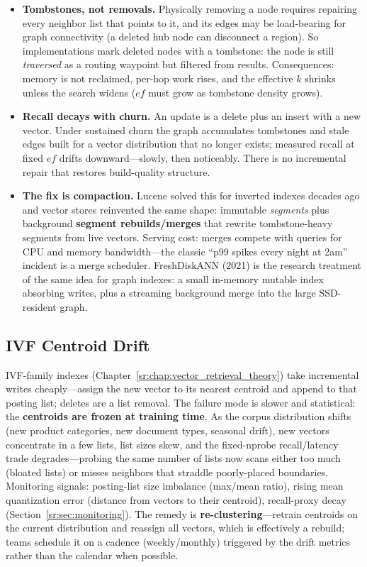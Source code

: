 \begin{itemize}
    \item \textbf{Tombstones, not removals.} Physically removing a node requires repairing every neighbor list that points to it, and its edges may be load-bearing for graph connectivity (a deleted hub node can disconnect a region). So implementations mark deleted nodes with a tombstone: the node is still \textit{traversed} as a routing waypoint but filtered from results. Consequences: memory is not reclaimed, per-hop work rises, and the effective $k$ shrinks unless the search widens ($ef$ must grow as tombstone density grows).
    \item \textbf{Recall decays with churn.} An update is a delete plus an insert with a new vector. Under sustained churn the graph accumulates tombstones and stale edges built for a vector distribution that no longer exists; measured recall at fixed $ef$ drifts downward---slowly, then noticeably. There is no incremental repair that restores build-quality structure.
    \item \textbf{The fix is compaction.} Lucene solved this for inverted indexes decades ago and vector stores reinvented the same shape: immutable \textit{segments} plus background \textbf{segment rebuilds/merges} that rewrite tombstone-heavy segments from live vectors. Serving cost: merges compete with queries for CPU and memory bandwidth---the classic ``p99 spikes every night at 2am'' incident is a merge scheduler. FreshDiskANN (2021) is the research treatment of the same idea for graph indexes: a small in-memory mutable index absorbing writes, plus a streaming background merge into the large SSD-resident graph.
\end{itemize}

\subsection{IVF Centroid Drift}

IVF-family indexes (Chapter~\ref{sr:chap:vector_retrieval_theory}) take incremental writes cheaply---assign the new vector to its nearest centroid and append to that posting list; deletes are a list removal. The failure mode is slower and statistical: the \textbf{centroids are frozen at training time}. As the corpus distribution shifts (new product categories, new document types, seasonal drift), new vectors concentrate in a few lists, list sizes skew, and the fixed-$\text{nprobe}$ recall/latency trade degrades---probing the same number of lists now scans either too much (bloated lists) or misses neighbors that straddle poorly-placed boundaries. Monitoring signals: posting-list size imbalance (max/mean ratio), rising mean quantization error (distance from vectors to their centroid), recall-proxy decay (Section~\ref{sr:sec:monitoring}). The remedy is \textbf{re-clustering}---retrain centroids on the current distribution and reassign all vectors, which is effectively a rebuild; teams schedule it on a cadence (weekly/monthly) triggered by the drift metrics rather than the calendar when possible.

